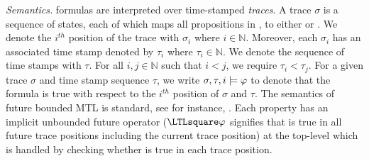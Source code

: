 \textit{Semantics. }
\planguage formulas are interpreted over time-stamped \emph{traces}. A trace $\sigma$ is a sequence of states, each of which maps all propositions in \sfmap, to either \true or \false. We denote the $i^{th}$ position of the trace with $\sigma_i$ where $i\in\mathbb{N}$. Moreover, each $\sigma_i$ has an associated time stamp denoted by $\tau_i$ where $\tau_i\in\mathbb{N}$.
We denote the sequence of time stamps with $\tau$. For all $i, j\in\mathbb{N}$ such that $i < j$, we require $\tau_i < \tau_j$. For a given trace $\sigma$ and time stamp sequence $\tau$, we write $\sigma, \tau, i\models\varphi$ to denote that the formula \policy is true with respect to the $i^{th}$ position of $\sigma$ and $\tau$.
The semantics of \planguage future bounded MTL is standard, see for instance, \cite{Basin2008}.
Each  property \policy has an implicit unbounded \henceforth future operator ($\henceforth\policy$ signifies that
\policy is true in all future trace positions including the current trace position) at the top-level which is handled by checking whether \policy is true in each trace position.

